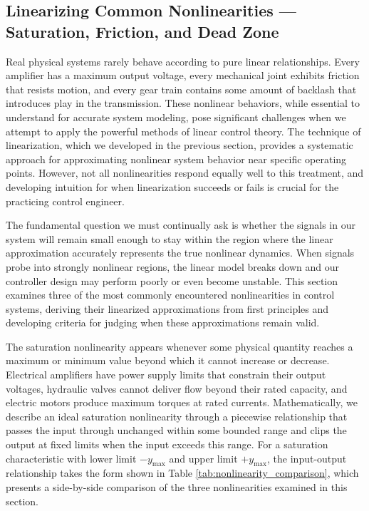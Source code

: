 \subsection{Linearizing Common Nonlinearities --- Saturation, Friction, and Dead Zone}

Real physical systems rarely behave according to pure linear relationships. Every amplifier has a maximum output voltage, every mechanical joint exhibits friction that resists motion, and every gear train contains some amount of backlash that introduces play in the transmission. These nonlinear behaviors, while essential to understand for accurate system modeling, pose significant challenges when we attempt to apply the powerful methods of linear control theory. The technique of linearization, which we developed in the previous section, provides a systematic approach for approximating nonlinear system behavior near specific operating points. However, not all nonlinearities respond equally well to this treatment, and developing intuition for when linearization succeeds or fails is crucial for the practicing control engineer.

The fundamental question we must continually ask is whether the signals in our system will remain small enough to stay within the region where the linear approximation accurately represents the true nonlinear dynamics. When signals probe into strongly nonlinear regions, the linear model breaks down and our controller design may perform poorly or even become unstable. This section examines three of the most commonly encountered nonlinearities in control systems, deriving their linearized approximations from first principles and developing criteria for judging when these approximations remain valid.

The saturation nonlinearity appears whenever some physical quantity reaches a maximum or minimum value beyond which it cannot increase or decrease. Electrical amplifiers have power supply limits that constrain their output voltages, hydraulic valves cannot deliver flow beyond their rated capacity, and electric motors produce maximum torques at rated currents. Mathematically, we describe an ideal saturation nonlinearity through a piecewise relationship that passes the input through unchanged within some bounded range and clips the output at fixed limits when the input exceeds this range. For a saturation characteristic with lower limit $-y_{\max}$ and upper limit $+y_{\max}$, the input-output relationship takes the form shown in Table \ref{tab:nonlinearity_comparison}, which presents a side-by-side comparison of the three nonlinearities examined in this section.

